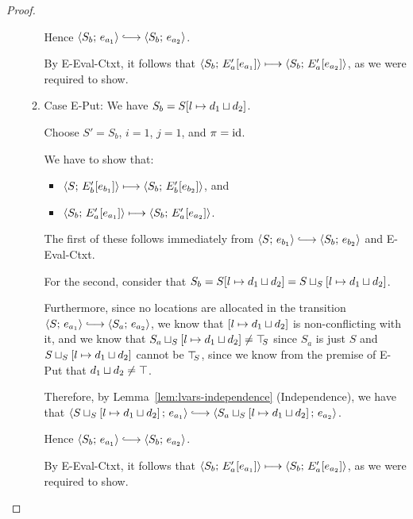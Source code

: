 \begin{proof}
\begin{enumerate}
\begin{enumerate}
      Hence $\config{S_b}{e_{a_1}} \parstepsto \config{S_b}{e_{a_2}}$.

      By {\sc E-Eval-Ctxt}, it follows that
      $\langle S_b;\, E'_a\hspace{-0.5mm}\left[e_{a_1}\right] \rangle \longmapsto
      \langle S_b;\, E'_a\hspace{-0.5mm}\left[e_{a_2}\right] \rangle$, as we were required to
      show.

    \item \label{lvars-slc-beta-put}Case {\sc E-Put}: We have $S_b =
      S[l \mapsto d_1 \sqcup d_2]$.

      Choose $S' = S_b$, $i = 1$, $j = 1$, and $\pi = \mathrm{id}$.

      We have to show that:
      \begin{itemize}
      \item $\langle S;\, E'_b\hspace{-0.5mm}\left[e_{b_1}\right] \rangle \longmapsto
        \langle S_b;\, E'_b\hspace{-0.5mm}\left[e_{b_2}\right] \rangle$, and
      \item $\langle S_b;\, E'_a\hspace{-0.5mm}\left[e_{a_1}\right] \rangle \longmapsto
        \langle S_b;\, E'_a\hspace{-0.5mm}\left[e_{a_2}\right] \rangle$.
      \end{itemize}

      The first of these follows immediately from $\config{S}{e_{b_1}}
      \parstepsto \config{S_b}{e_{b_2}}$ and {\sc E-Eval-Ctxt}.

      For the second, consider that $S_b =
      S[l \mapsto d_1 \sqcup d_2] =
      S \sqcup_{S} \left[ l \mapsto d_1 \sqcup d_2 \right]$.

      Furthermore, since no locations are allocated in the transition
      $\config{S}{e_{a_1}} \parstepsto \config{S_a}{e_{a_2}}$, we know
      that $\left[ l \mapsto d_1 \sqcup d_2 \right]$ is
      non-conflicting with it, and we know that
      $S_a \sqcup_{S} \left[ l \mapsto d_1 \sqcup d_2 \right]
      \neq \top\hspace{-0.85mm}_{S}$ since $S_a$ is just $S$ and
      $S \sqcup_{S} \left[ l \mapsto d_1 \sqcup d_2 \right]$
      cannot be $\top\hspace{-0.85mm}_{S}$, since we know from the premise of {\sc E-Put}
      that $d_1 \sqcup d_2 \neq \top$.

      Therefore, by Lemma~\ref{lem:lvars-independence} (Independence),
      we have that
      $\config{\lubstore{S}{\store{\storebindingRaw{l}{\userlub{d_1}{d_2}}}}}{e_{a_1}}
      \parstepsto
      \config{\lubstore{S_a}{\store{\storebindingRaw{l}{\userlub{d_1}{d_2}}}}}{e_{a_2}}$.


      Hence $\config{S_b}{e_{a_1}} \parstepsto \config{S_b}{e_{a_2}}$.
 
      By {\sc E-Eval-Ctxt}, it follows that
      $\langle S_b;\, E'_a\hspace{-0.5mm}\left[e_{a_1}\right] \rangle \longmapsto
      \langle S_b;\, E'_a\hspace{-0.5mm}\left[e_{a_2}\right] \rangle$, as we were required to
      show.


\end{enumerate}
\end{enumerate}
\end{proof}
